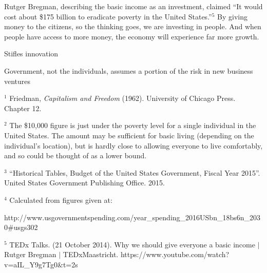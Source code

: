 \documentclass[12pt]{article}
\begin{document}
Rutger Bregman, describing the basic income as an investment, claimed ``It would cost about \$175 billion to eradicate poverty in the United States.''$^5$ By giving money to the citizens, so the thinking goes, we are investing in people. And when people have access to more money, the economy will experience far more growth.

Stifles innovation

Government, not the individuals, assumes a portion of the risk in new business ventures






\bigskip
\begin{footnotesize}
\noindent $^1$ Friedman, \emph{Capitalism and Freedom} (1962). University of Chicago Press. Chapter 12.
\smallskip

\noindent $^2$ The \$10,000 figure is just under the poverty level for a single individual in the United States. The amount may be sufficient for basic living (depending on the individual's location), but is hardly close to allowing everyone to live comfortably, and so could be thought of as a lower bound. %
\smallskip

\noindent $^3$ ``Historical Tables, Budget of the United States Government, Fiscal Year 2015''. United States Government Publishing Office. 2015.
\smallskip


\noindent $^4$ Calculated from figures given at:

\noindent http://www.usgovernmentspending.com/year\_spending\_2016USbn\_18bs6n\_2030\#usgs302
\smallskip

\noindent $^5$ TEDx Talks. (21 October 2014). Why we should give everyone a basic income $|$ Rutger Bregman $|$ TEDxMaastricht. https://www.youtube.com/watch?v=aIL\_Y9g7Tg0\&t=2s



\end{footnotesize}
\end{document}
